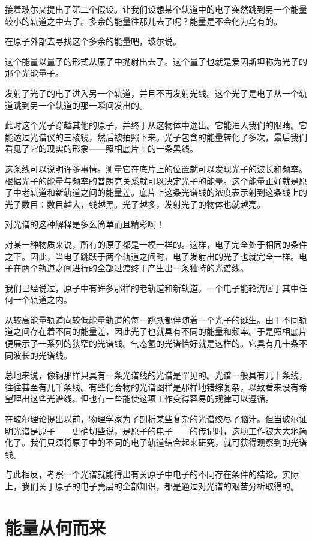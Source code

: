 接着玻尔又提出了第二个假设。让我们设想某个轨道中的电子突然跳到另一个能量较小的轨道之中去了。多余的能量往那儿去了呢？能量是不会化为乌有的。

在原子外部去寻找这个多余的能量吧，玻尔说。

这个能量以量子的形式从原子中抛射出去了。这个量子也就是爱因斯坦称为光子的那个光能量子。

发射了光子的电子进入另一个轨道，并且不再发射光线。这个光子是电子从一个轨道跳到另一个轨道的那一瞬间发出的。

此时这个光子穿越其他的原子，并终于从这物体中逸出。它能进入我们的限睛。它能透过光谱仪的三棱镜，然后被拍照下来。光子包含的能量转化了多次，最后我们看见了它的现实的形象——照相底片上的一条黑线。

这条线可以说明许多事情。测量它在底片上的位置就可以发现光子的波长和频率。根据光子的能量与频率的普朗克关系就可以决定光子的能晕。这个能量正好就是原子中老轨道和新轨道之间的能量差。底片上这条光谱线的浓度表示射到这条线上的光子数目：数目越大，线越黑。光子越多，发射光子的物体也就越亮。

对光谱的这种解释是多么简单而且精彩啊！

对某一种物质来说，所有的原子都是一模一样的。这样，电子完全处于相同的条件之下。因此，当电子跳跃于两个轨道之间时，电子发射出的光子也就完全一样。电子在两个轨道之间进行的全部过渡终于产生出一条独特的光谱线。

我们已经说过，原子中有许多那样的老轨道和新轨道。一个电子能轮流居于其中任何一个轨道之内。

从较高能量轨道向较低能量轨道的每一跳跃都伴随着一个光子的诞生。由于不同轨道之间存在着不同的能量差，因此光子也就具有不同的能量和频率。于是照相底片便展示了一系列的狭窄的光谱线。气态氢的光谱恰好就是这样的。它具有几十条不同波长的光谱线。

总地来说，像钠那样只具有一条光谱线的光谱是罕见的。光谱一般具有几十条线，往往甚至有几千条线。有些化合物的光谱图样是那样地错综复杂，以致看来没有希望理出这些光谱线。但也有一些能使这项工作变得容易的规律可以遵循。

在玻尔理论提出以前，物理学家为了剖析某些复杂的光谱绞尽了脑汁。但当玻尔证明光谱是原子——更确切些说，是原子的电子——的传记时，这项工作被大大地简化了。我们只须将原子中的不同的电子轨道结合起来研究，就可获得观察到的光谱线。

与此相反，考察一个光谱就能得出有关原子中电子的不同存在条件的结论。实际上，我们关于原子的电子壳层的全部知识，都是通过对光谱的艰苦分析取得的。

\section{能量从何而来}

